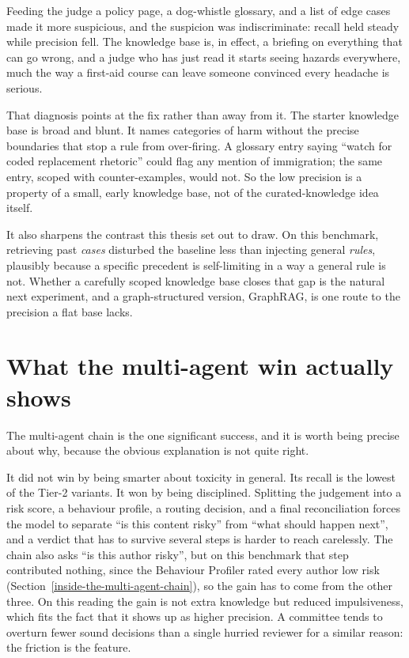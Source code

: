 Feeding the judge a policy page, a dog-whistle glossary, and a list of edge cases made it more suspicious, and the suspicion was indiscriminate: recall held steady while precision fell. The knowledge base is, in effect, a briefing on everything that can go wrong, and a judge who has just read it starts seeing hazards everywhere, much the way a first-aid course can leave someone convinced every headache is serious.

That diagnosis points at the fix rather than away from it. The starter knowledge base is broad and blunt. It names categories of harm without the precise boundaries that stop a rule from over-firing. A glossary entry saying ``watch for coded replacement rhetoric'' could flag any mention of immigration; the same entry, scoped with counter-examples, would not. So the low precision is a property of a small, early knowledge base, not of the curated-knowledge idea itself.

It also sharpens the contrast this thesis set out to draw. On this benchmark, retrieving past \emph{cases} disturbed the baseline less than injecting general \emph{rules}, plausibly because a specific precedent is self-limiting in a way a general rule is not. Whether a carefully scoped knowledge base closes that gap is the natural next experiment, and a graph-structured version, GraphRAG, is one route to the precision a flat base lacks.

\section{What the multi-agent win actually shows}\label{what-the-multi-agent-win-actually-shows}

The multi-agent chain is the one significant success, and it is worth being precise about why, because the obvious explanation is not quite right.

It did not win by being smarter about toxicity in general. Its recall is the lowest of the Tier-2 variants. It won by being disciplined. Splitting the judgement into a risk score, a behaviour profile, a routing decision, and a final reconciliation forces the model to separate ``is this content risky'' from ``what should happen next'', and a verdict that has to survive several steps is harder to reach carelessly. The chain also asks ``is this author risky'', but on this benchmark that step contributed nothing, since the Behaviour Profiler rated every author low risk (Section~\ref{inside-the-multi-agent-chain}), so the gain has to come from the other three. On this reading the gain is not extra knowledge but reduced impulsiveness, which fits the fact that it shows up as higher precision. A committee tends to overturn fewer sound decisions than a single hurried reviewer for a similar reason: the friction is the feature.

